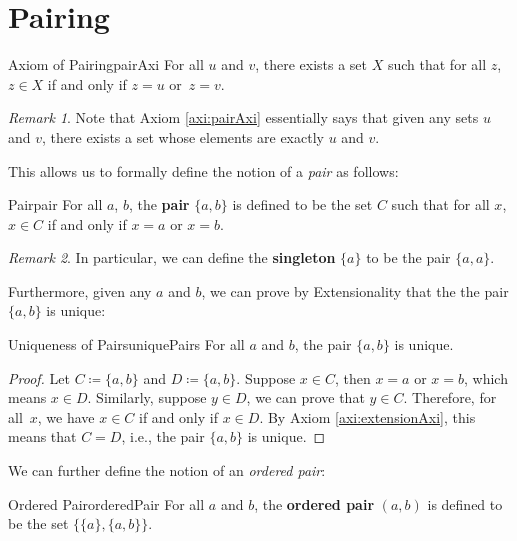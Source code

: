 \documentclass[math]{amznotes}
\theoremstyle{remark}
\newtheorem*{remark}{Remark}
\begin{document}
\section{Pairing}
\begin{axibox}{Axiom of Pairing}{pairAxi}
    For all $u$ and $v$, there exists a set $X$ such that for all $z$, $z \in X$ if and only if $z = u$ or~$z = v$.
\end{axibox}
\begin{notebox}
    \begin{remark}
        Note that Axiom \ref{axi:pairAxi} essentially says that given any sets $u$ and $v$, there exists a set whose elements are exactly $u$ and $v$.
    \end{remark}
\end{notebox}
This allows us to formally define the notion of a \textit{pair} as follows:
\begin{dfnbox}{Pair}{pair}
    For all $a$, $b$, the {\color{red} \textbf{pair}} $\{a, b\}$ is defined to be the set $C$ such that for all $x$, $x \in C$ if and only if $x = a$ or $x = b$.
\end{dfnbox}
\begin{notebox}
    \begin{remark}
        In particular, we can define the \textbf{singleton} $\{a\}$ to be the pair $\{a, a\}$.
    \end{remark}
\end{notebox}
Furthermore, given any $a$ and $b$, we can prove by Extensionality that the the pair $\{a, b\}$ is unique:
\begin{thmbox}{Uniqueness of Pairs}{uniquePairs}
    For all $a$ and $b$, the pair $\{a, b\}$ is unique.
    \tcblower   
    \begin{proof}
        Let $C \coloneqq \{a, b\}$ and $D \coloneqq \{a, b\}$. Suppose $x \in C$, then $x = a$ or $x = b$, which means $x \in D$. Similarly, suppose $y \in D$, we can prove that $y \in C$. Therefore, for all~$x$, we have $x \in C$ if and only if $x \in D$. By Axiom \ref{axi:extensionAxi}, this means that $C = D$, i.e., the pair $\{a, b\}$ is unique.
    \end{proof}
\end{thmbox}
We can further define the notion of an \textit{ordered pair}:
\begin{dfnbox}{Ordered Pair}{orderedPair}
    For all $a$ and $b$, the {\color{red} \textbf{ordered pair}} $(a, b)$ is defined to be the set $\bigl\{\{a\}, \{a, b\}\bigr\}$.
\end{dfnbox}
\end{document}
